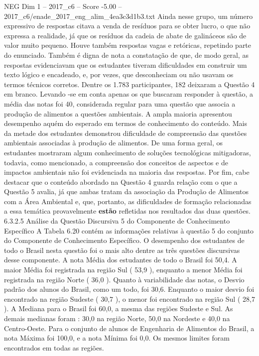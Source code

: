 \begin{textsample}{NEG Dim 1 – 2017\_c6 – Score -5.00 – 2017\_c6/enade\_2017\_eng\_alim\_4ea3c3d1b3.txt}
Ainda nesse grupo, um número expressivo de respostas citava a venda de resíduos para se obter lucro, o que não expressa a realidade, já que os resíduos da cadeia de abate de galináceos são de valor muito pequeno.
Houve também respostas vagas e retóricas, repetindo parte do enunciado.
Também é digna de nota a constatação de que, de modo geral, as respostas evidenciavam que os estudantes tiveram dificuldades em construir um texto lógico e encadeado, e, por vezes, que desconheciam ou não usavam os termos técnicos corretos.
Dentre os 1.783 participantes, 182 deixaram a Questão 4 em branco.
Levando -se em conta apenas os que buscaram responder à questão, a média das notas foi 40, considerada regular para uma questão que associa a produção de alimentos a questões ambientais.
A ampla maioria apresentou desempenho aquém do esperado em termos de conhecimento do conteúdo.
Mais da metade dos estudantes demonstrou dificuldade de compreensão das questões ambientais associadas à produção de alimentos.
De uma forma geral, os estudantes mostraram algum conhecimento de soluções tecnológicas mitigadoras, todavia, como mencionado, a compreensão dos conceitos de aspectos e de impactos ambientais não foi evidenciada na maioria das respostas.
Por fim, cabe destacar que o conteúdo abordado na Questão 4 guarda relação com o que a Questão 5 avalia, já que ambas tratam da associação da Produção de Alimentos com a Área Ambiental e, que, portanto, as dificuldades de formação relacionadas a essa temática provavelmente \textbf{estão} refletidas nos resultados das duas questões. 6.3.2.5 Análise da Questão Discursiva 5 do Componente de Conhecimento Específico A Tabela 6.20 contém as informações relativas à questão 5 do conjunto do Componente de Conhecimento Específico.
O desempenho dos estudantes de todo o Brasil nesta questão foi o mais alto dentre as três questões discursivas desse componente.
A nota Média dos estudantes de todo o Brasil foi 50,4.
A maior Média foi registrada na região Sul ( 53,9 ), enquanto a menor Média foi registrada na região Norte ( 36,0 ).
Quanto à variabilidade das notas, o Desvio padrão dos alunos do Brasil, como um todo, foi 30,6.
Enquanto o maior desvio foi encontrado na região Sudeste ( 30,7 ), o menor foi encontrado na região Sul ( 28,7 ).
A Mediana para o Brasil foi 60,0, a mesma das regiões Sudeste e Sul.
As demais medianas foram : 30,0 na região Norte, 50,0 na Nordeste e 40,0 na Centro-Oeste.
Para o conjunto de alunos de Engenharia de Alimentos do Brasil, a nota Máxima foi 100,0, e a nota Mínima foi 0,0.
Os mesmos limites foram encontrados em todas as regiões.

\end{textsample}
